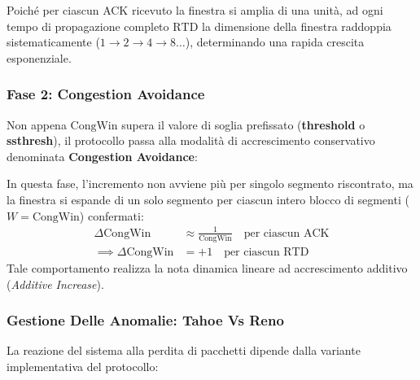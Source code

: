 \documentclass[11pt, a4paper]{article}
\begin{document}
Poiché per ciascun ACK ricevuto la finestra si amplia di una unità, ad ogni tempo di propagazione completo $\text{RTD}$ la dimensione della finestra raddoppia sistematicamente ($1 \to 2 \to 4 \to 8 \dots$), determinando una rapida crescita esponenziale.

\subsubsection{Fase 2: Congestion Avoidance}
Non appena $\text{CongWin}$ supera il valore di soglia prefissato (\textbf{threshold} o \textbf{ssthresh}), il protocollo passa alla modalità di accrescimento conservativo denominata \textbf{Congestion Avoidance}:


In questa fase, l'incremento non avviene più per singolo segmento riscontrato, ma la finestra si espande di un solo segmento per ciascun intero blocco di segmenti ($W = \text{CongWin}$) confermati:
\begin{align*}
    \Delta \text{CongWin} &\approx \frac{1}{\text{CongWin}} \quad \text{per ciascun ACK} \\
    \implies \Delta \text{CongWin} &= +1 \quad \text{per ciascun RTD}
\end{align*}
Tale comportamento realizza la nota dinamica lineare ad accrescimento additivo (\emph{Additive Increase}).

\subsubsection{Gestione Delle Anomalie: Tahoe Vs Reno}

La reazione del sistema alla perdita di pacchetti dipende dalla variante implementativa del protocollo:
\end{document}
